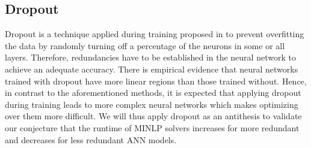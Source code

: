 \subsection{Dropout} \label{sec:dropout}

Dropout is a technique applied during training proposed in \citet{Srivastava2014} to prevent overfitting the data by randomly turning off a percentage of the neurons in some or all layers. Therefore, redundancies have to be established in the neural network to achieve an adequate accuracy. There is empirical evidence that neural networks trained with dropout have more linear regions \citep{Zhang2020a} than those trained without. Hence, in contrast to the aforementioned methods, it is expected that applying dropout during training leads to more complex neural networks which makes optimizing over them more difficult.
We will thus apply dropout as an antithesis to validate our conjecture that the runtime of MINLP solvers increases for more redundant and decreases for less redundant ANN models.
